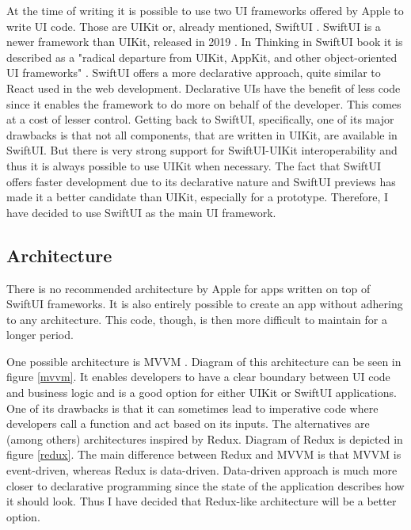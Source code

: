 At the time of writing it is possible to use two UI frameworks offered by Apple to write UI code. Those are UIKit \cite{uikit} or, already mentioned, SwiftUI \cite{swiftui}. SwiftUI is a newer framework than UIKit, released in 2019 \cite{swiftui-release}. In Thinking in SwiftUI book it is described as a "radical departure from UIKit, AppKit, and other object-oriented UI frameworks" \cite{thinking-in-swiftui}. SwiftUI offers a more declarative approach, quite similar to React \cite{react} used in the web development. Declarative UIs have the benefit of less code since it enables the framework to do more on behalf of the developer. This comes at a cost of lesser control. Getting back to SwiftUI, specifically, one of its major drawbacks is that not all components, that are written in UIKit, are available in SwiftUI. But there is very strong support for SwiftUI-UIKit interoperability \cite{swiftui-interop} and thus it is always possible to use UIKit when necessary. The fact that SwiftUI offers faster development due to its declarative nature and SwiftUI previews \cite{swiftui-preview} has made it a better candidate than UIKit, especially for a prototype. Therefore, I have decided to use SwiftUI as the main UI framework.

\subsection{Architecture}

There is no recommended architecture by Apple for apps written on top of SwiftUI frameworks. It is also entirely possible to create an app without adhering to any architecture. This code, though, is then more difficult to maintain for a longer period.

One possible architecture is MVVM \cite{mvvm}. Diagram of this architecture can be seen in figure \ref{mvvm}. It enables developers to have a clear boundary between UI code and business logic and is a good option for either UIKit or SwiftUI applications. One of its drawbacks is that it can sometimes lead to imperative code where developers call a function and act based on its inputs. The alternatives are (among others) architectures inspired by Redux. Diagram of Redux is depicted in figure \ref{redux}. The main difference between Redux and MVVM is that MVVM is event-driven, whereas Redux is data-driven. Data-driven approach is much more closer to declarative programming since the state of the application describes how it should look. Thus I have decided that Redux-like architecture will be a better option.

